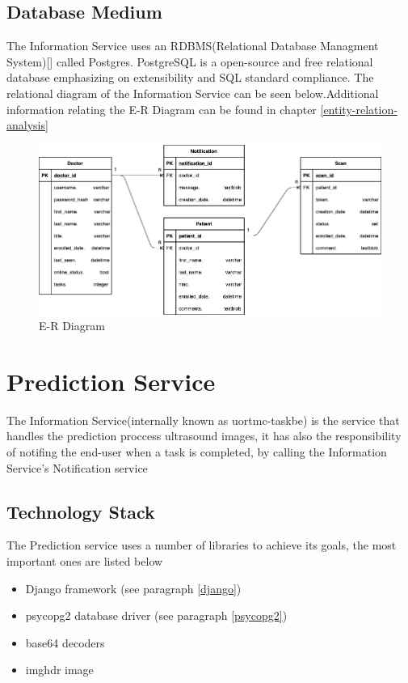 		\subsection{Database Medium}
			The Information Service uses an RDBMS(Relational Database Managment System)[\cite{friedrichsen_ruffolo_monk_starks_pratt_last_1995}] called Postgres. PostgreSQL is a open-source and 
			free relational database emphasizing on extensibility and SQL standard compliance. The relational diagram of the Information Service
			can be seen below.Additional information relating the E-R Diagram can be found in chapter \ref{entity-relation-analysis} \pagebreak
			\begin{figure}[H]
				\iftrue
				\caption{E-R Diagram}
				\centering
				\includegraphics[angle=90,origin=c,scale=0.8]{figures/InformationServiceDatabaseDiagram}
				\fi
			\end{figure}\pagebreak
	
	\section{Prediction Service}
		The Information Service(internally known as uortmc-taskbe) is the service that handles the prediction proccess ultrasound images, it has 
		also the responsibility of notifing the end-user when a task is completed, by calling the Information Service's Notification service 
		\subsection{Technology Stack}
		The Prediction service uses a number of libraries to achieve its goals, the most important ones are listed below
		\begin{itemize}
			\item Django framework (see paragraph \ref{django})
			\item psycopg2 database driver (see paragraph \ref{psycopg2})
			\item base64 decoders
			\item imghdr image
		\end{itemize}
